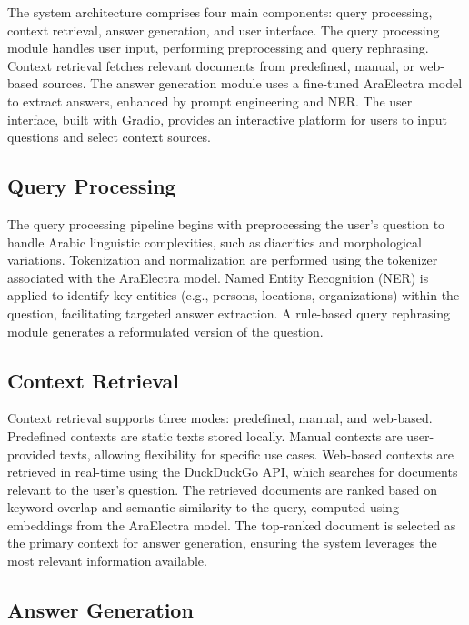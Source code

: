 \documentclass[conference]{IEEEtran}
\begin{document}
The system architecture comprises four main components: query processing, context retrieval, answer generation, and user interface. The query processing module handles user input, performing preprocessing and query rephrasing. Context retrieval fetches relevant documents from predefined, manual, or web-based sources. The answer generation module uses a fine-tuned AraElectra model to extract answers, enhanced by prompt engineering and NER. The user interface, built with Gradio, provides an interactive platform for users to input questions and select context sources.

\subsection{Query Processing}

The query processing pipeline begins with preprocessing the user’s question to handle Arabic linguistic complexities, such as diacritics and morphological variations. Tokenization and normalization are performed using the tokenizer associated with the AraElectra model. Named Entity Recognition (NER) is applied to identify key entities (e.g., persons, locations, organizations) within the question, facilitating targeted answer extraction. A rule-based query rephrasing module generates a reformulated version of the question.

\subsection{Context Retrieval}

Context retrieval supports three modes: predefined, manual, and web-based. Predefined contexts are static texts stored locally. Manual contexts are user-provided texts, allowing flexibility for specific use cases. Web-based contexts are retrieved in real-time using the DuckDuckGo API, which searches for documents relevant to the user’s question. The retrieved documents are ranked based on keyword overlap and semantic similarity to the query, computed using embeddings from the AraElectra model. The top-ranked document is selected as the primary context for answer generation, ensuring the system leverages the most relevant information available.

\subsection{Answer Generation}
\end{document}
